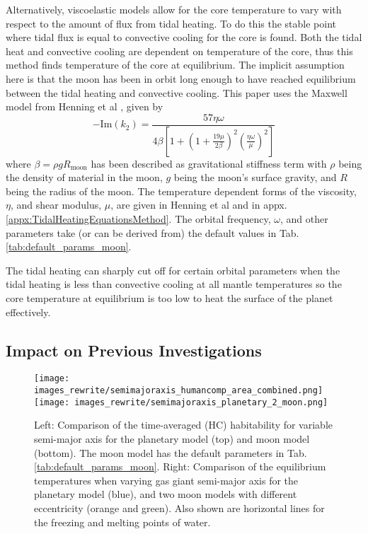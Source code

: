 \documentclass[12pt, onecolumn]{revtex4-2}    %
\begin{document}
Alternatively, viscoelastic models allow for the core temperature to vary with respect to the amount of flux from tidal heating.
To do this the stable point where tidal flux is equal to convective cooling for the core is found.
Both the tidal heat and convective cooling are dependent on temperature of the core, thus this method finds temperature of the core at equilibrium.
The implicit assumption here is that the moon has been in orbit long enough to have reached equilibrium between the tidal heating and convective cooling.
This paper uses the Maxwell model from Henning et al \cite{Henning2009}, given by
\begin{equation}
  -\text{Im}(k_2) = \frac{57 \eta \omega} 
  {4 \beta \left[ 1 + \left(1 + \frac{19 \mu}{2 \beta}\right)^2 
  \left(\frac{\eta \omega}{\mu}\right)^2 \right]}
  \label{eq:imk2_maxwell}
\end{equation}
where $\beta = \rho g R_\text{moon}$ has been described as gravitational stiffness term with $\rho$ being the density of material in the moon, $g$ being the moon's surface gravity, and $R$ being the radius of the moon.
The temperature dependent forms of the viscosity, $\eta$, and shear modulus, $\mu$, are given in Henning et al \cite{Henning2009} and in appx. \ref{appx:TidalHeatingEquationsMethod}. 
The orbital frequency, $\omega$, and other parameters take (or can be derived from) the default values in Tab. \ref{tab:default_params_moon}.

The tidal heating can sharply cut off for certain orbital parameters when the tidal heating is less than convective cooling at all mantle temperatures so the core temperature at equilibrium is too low to heat the surface of the planet effectively.


\subsection{Impact on Previous Investigations} \label{ssec:Impact_previous_results}
%
\begin{figure}[t]
  \texttt{[image: images\_rewrite/semimajoraxis\_humancomp\_area\_combined.png]}
  \texttt{[image: images\_rewrite/semimajoraxis\_planetary\_2\_moon.png]}
  \caption{
    Left: Comparison of the time-averaged (HC) habitability for variable semi-major axis for the planetary model (top) and moon model (bottom). 
    The moon model has the default parameters in Tab. \ref{tab:default_params_moon}.
    Right: Comparison of the equilibrium temperatures when varying gas giant semi-major axis for the planetary model (blue), and two moon models with different eccentricity (orange and green).
    Also shown are horizontal lines for the freezing and melting points of water.
  }
  \label{fig:semimajoraxiscomparision}
\end{figure}
\end{document}
